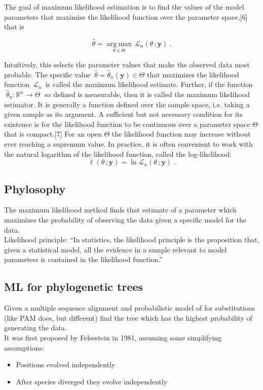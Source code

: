 The goal of maximum likelihood estimation is to find the values of the model parameters that maximize the likelihood function over the parameter space,[6] that is

\begin{equation}
{\hat {\theta }}={\underset {\theta \in \Theta }{\operatorname {arg\;max} }\,{\mathcal {L}}_{n}(\theta \,;\mathbf {y} )~.}
\end{equation}

Intuitively, this selects the parameter values that make the observed data most probable. The specific value 
$  ~{\hat {\theta }}={\hat {\theta }}_{n}(\mathbf {y} )\in \Theta $ that maximizes the likelihood function 
$ \,{\mathcal {L}}_{n}\,$ is called the maximum likelihood estimate. Further, if the function 
$ \;{\hat {\theta }}_{n}:\mathbb {R} ^{n}\to \Theta \;$
so defined is measurable, then it is called the maximum likelihood estimator. It is generally a function defined over the sample space, i.e. taking a given sample as its argument. A sufficient but not necessary condition for its existence is for the likelihood function to be continuous over a parameter space $\Theta$ that is compact.[7] For an open $\Theta$  the likelihood function may increase without ever reaching a supremum value.
In practice, it is often convenient to work with the natural logarithm of the likelihood function, called the log-likelihood:
\begin{equation}
\ell (\theta \,;\mathbf {y} )=\ln {\mathcal {L}}_{n}(\theta \,;\mathbf {y} )~.
\end{equation}

\subsection{Phylosophy}
The maximum likelihood method finds that estimate of a parameter which maximizes the probability of observing the data given a specific model for the data.\\
Likelihood principle: “In statistics, the likelihood principle is the proposition that, given a statistical model, all the evidence in a sample relevant to model parameters is contained in the likelihood function.” 

\subsection{ML for phylogenetic trees}
Given a multiple sequence alignment and probabilistic model of for substitutions (like PAM does, but different) find the tree which has the highest probability of generating the data. 
\\
It was first proposed by Felsestein in 1981, assuming some simplifying assumptions:
\begin{itemize}
\item Positions evolved independently
\item After species diverged they evolve independently
\end{itemize}

